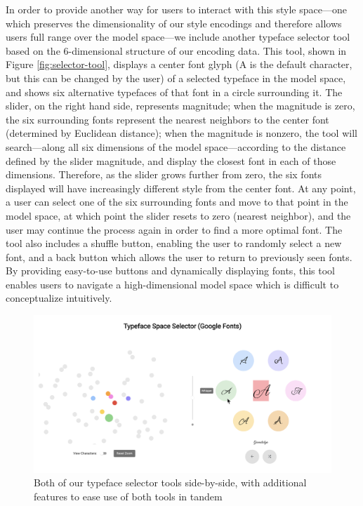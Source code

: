 In order to provide another way for users to interact with this style space—one which preserves the dimensionality of our style encodings and therefore allows users full range over the model space—we include another typeface selector tool based on the 6-dimensional structure of our encoding data. This tool, shown in Figure \ref{fig:selector-tool}, displays a center font glyph (A is the default character, but this can be changed by the user) of a selected typeface in the model space, and shows six alternative typefaces of that font in a circle surrounding it. The slider, on the right hand side, represents magnitude; when the magnitude is zero, the six surrounding fonts represent the nearest neighbors to the center font (determined by Euclidean distance); when the magnitude is nonzero, the tool will search—along all six dimensions of the model space—according to the distance defined by the slider magnitude, and display the closest font in each of those dimensions. Therefore, as the slider grows further from zero, the six fonts displayed will have increasingly different style from the center font. At any point, a user can select one of the six surrounding fonts and move to that point in the model space, at which point the slider resets to zero (nearest neighbor), and the user may continue the process again in order to find a more optimal font. The tool also includes a shuffle button, enabling the user to randomly select a new font, and a back button which allows the user to return to previously seen fonts. By providing easy-to-use buttons and dynamically displaying fonts, this tool enables users to navigate a high-dimensional model space which is difficult to conceptualize intuitively.

\begin{figure}[h]
    \centering
    \includegraphics[width=\textwidth]{images/both-selectors.png}
    \caption{Both of our typeface selector tools side-by-side, with additional features to ease use of both tools in tandem}
    \label{fig:both-selectors}
\end{figure}

